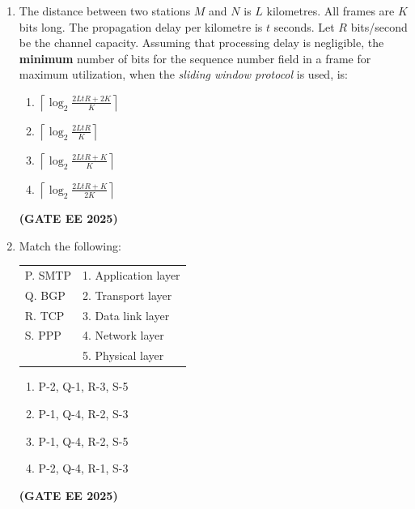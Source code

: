 \documentclass[journal,12pt,onecolumn]{IEEEtran}
\theoremstyle{remark}
\begin{document}
\begin {center}
\begin{enumerate}
\begin{enumerate}
    \end{enumerate}
 \hfill \textbf{(GATE EE 2025)}
    \item The distance between two stations $M$ and $N$ is $L$ kilometres. All frames are $K$ bits long. The propagation delay per kilometre is $t$ seconds. Let $R$ bits/second be the channel capacity. Assuming that processing delay is negligible, the \textbf{minimum} number of bits for the sequence number field in a frame for maximum utilization, when the \textit{sliding window protocol} is used, is:  
    \begin{enumerate}
        \item $\left\lceil \log_2 \frac{2L t R + 2K}{K} \right\rceil$
        \item $\left\lceil \log_2 \frac{2L t R}{K} \right\rceil$
        \item $\left\lceil \log_2 \frac{2L t R + K}{K} \right\rceil$
        \item $\left\lceil \log_2 \frac{2L t R + K}{2K} \right\rceil$
    \end{enumerate}
\hfill \textbf{(GATE EE 2025)}
    \item Match the following:
    \newline
   
    \begin{tabular}{ll}
        P. SMTP & 1. Application layer \\
        Q. BGP & 2. Transport layer \\
        R. TCP & 3. Data link layer \\
        S. PPP & 4. Network layer \\
                & 5. Physical layer
    \end{tabular}
  

    \begin{enumerate}
        \item P-2, Q-1, R-3, S-5
        \item P-1, Q-4, R-2, S-3
        \item P-1, Q-4, R-2, S-5
        \item P-2, Q-4, R-1, S-3
    \end{enumerate}
    \hfill \textbf{(GATE EE 2025)}
\begin{center}
    

\end{center}
\end{enumerate}
\end{center}
\end{document}
